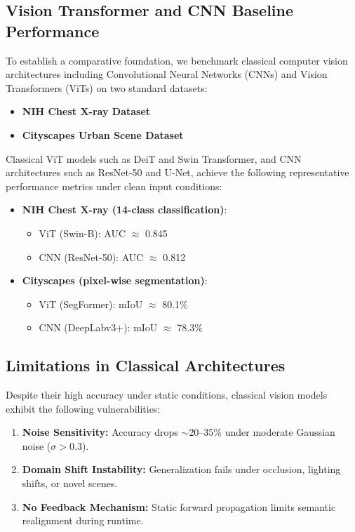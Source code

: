 \documentclass[12pt]{article}
\theoremstyle{plain}
\begin{document}
\subsection*{Vision Transformer and CNN Baseline Performance}

To establish a comparative foundation, we benchmark classical computer vision architectures including Convolutional Neural Networks (CNNs) and Vision Transformers (ViTs) on two standard datasets:
\begin{itemize}
    \item \textbf{NIH Chest X-ray Dataset} \cite{nih-chestxray}
    \item \textbf{Cityscapes Urban Scene Dataset} \cite{cityscapes}
\end{itemize}

Classical ViT models such as DeiT and Swin Transformer, and CNN architectures such as ResNet-50 and U-Net, achieve the following representative performance metrics under clean input conditions:
\begin{itemize}
    \item \textbf{NIH Chest X-ray (14-class classification)}:
    \begin{itemize}
        \item ViT (Swin-B): AUC $\approx$ 0.845
        \item CNN (ResNet-50): AUC $\approx$ 0.812
    \end{itemize}
    \item \textbf{Cityscapes (pixel-wise segmentation)}:
    \begin{itemize}
        \item ViT (SegFormer): mIoU $\approx$ 80.1\%
        \item CNN (DeepLabv3+): mIoU $\approx$ 78.3\%
    \end{itemize}
\end{itemize}

\subsection*{Limitations in Classical Architectures}

Despite their high accuracy under static conditions, classical vision models exhibit the following vulnerabilities:
\begin{enumerate}
    \item \textbf{Noise Sensitivity:} Accuracy drops $\sim$20--35\% under moderate Gaussian noise ($\sigma > 0.3$).
    \item \textbf{Domain Shift Instability:} Generalization fails under occlusion, lighting shifts, or novel scenes.
    \item \textbf{No Feedback Mechanism:} Static forward propagation limits semantic realignment during runtime.
\end{enumerate}
\end{document}
